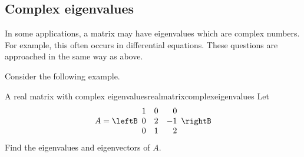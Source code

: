 \subsection{Complex eigenvalues}

In some applications, a matrix may have eigenvalues
 which are complex numbers. For example, this often occurs in
differential equations. These questions are approached in the same way as above.

Consider the following example.

\begin{example}{A real matrix with complex eigenvalues}{realmatrixcomplexeigenvalues}
Let 
\begin{equation*}
A=\leftB
\begin{array}{rrr}
1 & 0 &  0 \\
0 & 2 & -1 \\
0 & 1 &  2
\end{array}
\rightB 
\end{equation*}
Find the eigenvalues and eigenvectors of $A$.
\end{example}

